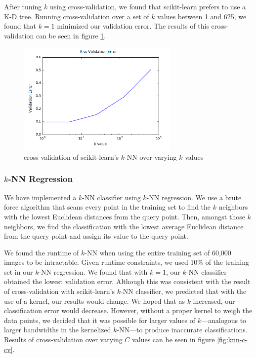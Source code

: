 \documentclass{article} %
\begin{document}
After tuning $k$ using cross-validation, we found that scikit-learn prefers to
use a K-D tree. Running cross-validation over a set of $k$ values between
1 and 625, we found that $k = 1$ minimized our validation error. The results of
this cross-validation can be seen in figure \ref{fig:sklearn-knn-k-cv}.

\begin{figure}[h]
\centering
\includegraphics[width=0.7\textwidth]{sklearn-knn-k-cv.png}
\caption{cross validation of scikit-learn's $k$-NN over varying $k$ values}
\label{fig:sklearn-knn-k-cv}
\end{figure}

\subsubsection{$k$-NN Regression}
We have implemented a $k$-NN classifier using
$k$-NN regression. 
We use a brute force algorithm that scans
every point in the training set to find the $k$ neighbors with the lowest
Euclidean distances from the query point. Then, amongst those $k$ neighbors,
we find the classification with the lowest average Euclidean distance from
the query point and assign its value to the query point.

We found the runtime of $k$-NN when using the entire training set of 60,000
images to be intractable. Given runtime constraints,
we used 10\% of the training set in our $k$-NN regression.
We found that with $k = 1$, our $k$-NN classifier obtained the lowest validation
error. Although this was consistent with the result of cross-validation with
scikit-learn's
$k$-NN classifier, we predicted that with the use of a kernel, our results would change.
We hoped that as $k$
increased, our classification error would decrease. However, without a
proper kernel to weigh the data points, we decided that it was possible for
larger values of $k$---analogous to larger bandwidths in the kernelized $k$-NN---to produce inaccurate classifications.
Results of cross-validation over varying $C$ values can be seen in figure \ref{fig:knn-c-cv}.
\end{document}
